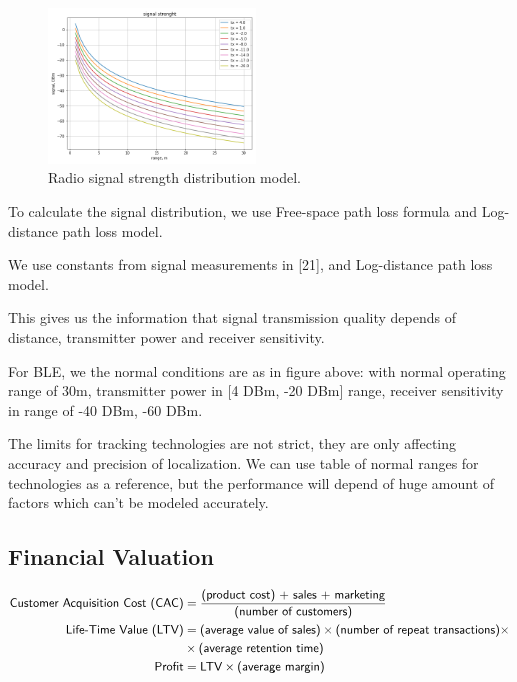 \begin{figure}
	\includegraphics[width=0.49\textwidth]{graphics/roadmap/signal_strenght.png}
	\caption{Radio signal strength distribution model.}
	\label{fig:signal}
\end{figure}
To calculate the signal distribution, we use Free-space path loss formula and Log-distance path loss model.

We use constants from signal measurements in [21], and Log-distance path loss model.

This gives us the information that signal transmission quality depends of distance, transmitter power and receiver sensitivity.

For BLE, we the normal conditions are as in figure above: with normal operating range of 30m, transmitter power in [4 DBm, -20 DBm] range, receiver sensitivity in range of -40 DBm, -60 DBm.

The limits for tracking technologies are not strict, they are only affecting accuracy and precision of localization. We can use table of normal ranges for technologies as a reference, but the performance will depend of huge amount of factors which can't be modeled accurately.

\subsection{Financial Valuation}

\begin{align}
\textsf{Customer Acquisition Cost (CAC)} &= \frac{\textsf{(product cost) + sales + marketing}}{\textsf{(number of customers)}}  \\
\textsf{Life-Time Value (LTV)} &= \textsf{(average value of sales)} \times \textsf{(number of repeat transactions)} \times \notag\\
&\times \textsf{(average retention time)} \\
\textsf{Profit} &= \textsf{LTV} \times\textsf{(average margin)}
\end{align}


